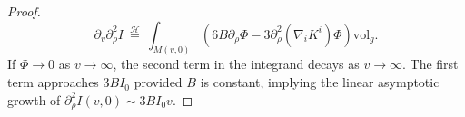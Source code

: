 \documentclass[10pt,a4paper]{amsart}
\begin{document}
\begin{proof}
    \begin{equation}
        \partial_v\partial_\rho^2I \:\overset{\mathcal{H}}{=}\:  \int_{M(v,0)}\left(6B \partial_\rho \Phi -3 \partial_\rho^2(\nabla_i K^i)\Phi\right)\text{vol}_g.
   \end{equation}
    If $\Phi \to 0$ as $v \to \infty$, the second term in the integrand decays as $v \to \infty$. The first term approaches $3BI_0$ provided $B$ is constant, implying the linear asymptotic growth of $\partial_\rho^2 I(v,0) \sim 3BI_0v$.
\end{proof}
\end{document}
